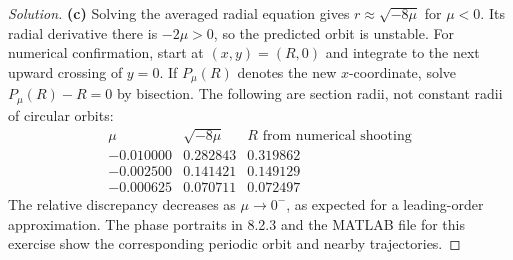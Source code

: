 \documentclass[10pt]{amsart}
\newenvironment{solution}
{\begin{proof}[Solution]}
{\end{proof}}
\begin{document}
\begin{onehalfspace}
\begin{solution}
\textbf{(c)} Solving the averaged radial equation gives $r\approx\sqrt{-8\mu}$ for $\mu<0$. Its radial derivative there is $-2\mu>0$, so the predicted orbit is unstable. For numerical confirmation, start at $(x,y)=(R,0)$ and integrate to the next upward crossing of $y=0$. If $P_\mu(R)$ denotes the new $x$-coordinate, solve $P_\mu(R)-R=0$ by bisection. The following are section radii, not constant radii of circular orbits:
\[
\begin{array}{r|c|c}
 \mu&\sqrt{-8\mu}&R\text{ from numerical shooting}\\\hline
 -0.010000&0.282843&0.319862\\
 -0.002500&0.141421&0.149129\\
 -0.000625&0.070711&0.072497
\end{array}
\]
The relative discrepancy decreases as $\mu\to0^-$, as expected for a leading-order approximation. The phase portraits in 8.2.3 and the MATLAB file for this exercise show the corresponding periodic orbit and nearby trajectories.


\end{solution}
\end{onehalfspace}
\end{document}
